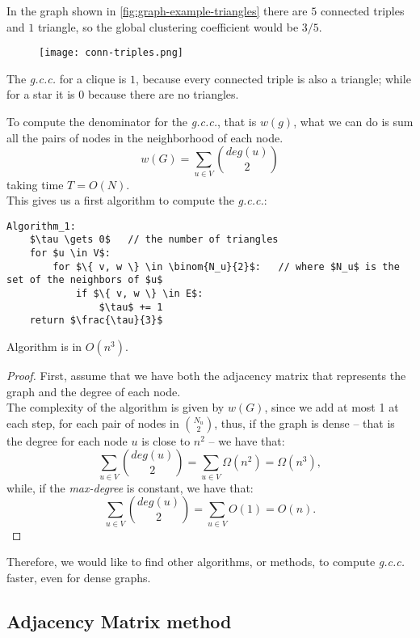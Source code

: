 In the graph shown in \cref{fig:graph-example-triangles} there are $5$ connected triples and $1$ triangle, so the global clustering coefficient would be $3/5$.
%
\begin{figure}[h!]
	\centering
	\texttt{[image: conn-triples.png]}
\end{figure}

\obs The \emph{g.c.c.} for a clique is $1$, because every connected triple is also a triangle; while for a star it is $0$ because there are no triangles.

To compute the denominator for the \emph{g.c.c.}, that is $w(g)$, what we can do is sum all the pairs of nodes in the neighborhood of each node.
\[
	w(G) = \sum_{u \in V}\binom{deg(u)}{2}
\]
taking time $T = O(N)$.\\
This gives us a first algorithm to compute the \emph{g.c.c.}:
%
\begin{lstlisting}[caption={Algorithm 1}, label={lst:triangles-alg1}]
Algorithm_1:
    $\tau \gets 0$   // the number of triangles
    for $u \in V$:
        for $\{ v, w \} \in \binom{N_u}{2}$:   // where $N_u$ is the set of the neighbors of $u$
            if $\{ v, w \} \in E$:
                $\tau$ += 1
    return $\frac{\tau}{3}$
\end{lstlisting}
%
\begin{claim}\label{cl:triangles-1}
	Algorithm is in $O(n^3)$.
\end{claim}
\begin{proof}
    First, assume that we have both the adjacency matrix that represents the graph and the degree of each node.\\
    The complexity of the algorithm is given by $w(G)$, since we add at most 1 at each step, for each pair of nodes in $\binom{N_u}{2}$, thus,
	if the graph is dense -- that is the degree for each node $u$ is close to $n^2$ -- we have that:
	\[
		\sum_{u \in V}\binom{deg(u)}{2} = \sum_{u \in V}\Omega(n^2) = \Omega(n^3),
	\]
	while, if the \textit{max-degree} is constant, we have that:
	\[
		\sum_{u \in V}\binom{deg(u)}{2} = \sum_{u \in V} O(1) = O(n).
	\]
\end{proof}

Therefore, we would like to find other algorithms, or methods, to compute \textit{g.c.c.} faster, even for dense graphs.


\subsection{Adjacency Matrix method}\label{sec:triangles-adjacency}

